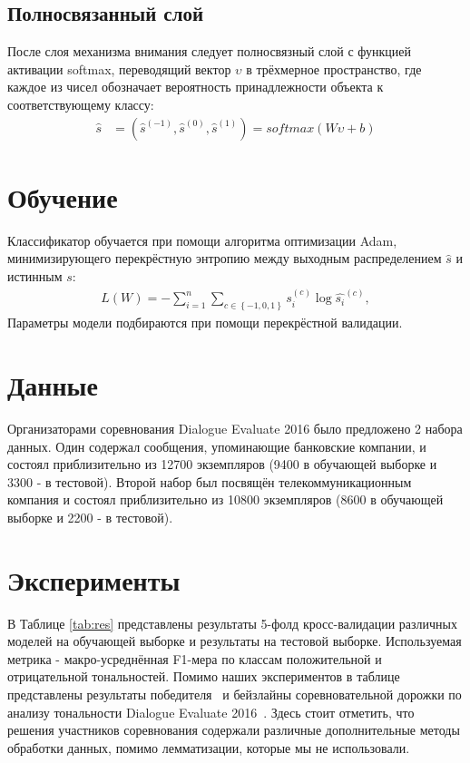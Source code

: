 \documentclass[12pt]{article}
\newcommand{\ENGLISH}[1]{#1}
\begin{document}
\subsection{Полносвязанный слой}
После слоя механизма внимания следует полносвязный слой с функцией активации \ENGLISH{softmax}, переводящий вектор $\upsilon$ в трёхмерное пространство, где каждое из чисел обозначает вероятность принадлежности объекта к соответствующему классу:
	\begin{align}	
    \hat{s}&=(\hat{s}^{(-1)},\hat{s}^{(0)},\hat{s}^{(1)})=softmax(W\upsilon+b)
	\end{align}

\section{Обучение}
Классификатор обучается при помощи алгоритма оптимизации Adam, минимизирующего перекрёстную энтропию между выходным распределением $\hat{s}$ и истинным $s$:
    \begin{align}
    L(W)=-\sum_{i=1}^{n}\sum_{c\in\left \{ -1,0,1 \right \}}s_{i}^{(c)}\log{\hat{s_{i}}^{(c)}},
    \end{align}
Параметры модели подбираются при помощи перекрёстной валидации.

\section{Данные}
Организаторами соревнования Dialogue Evaluate 2016 было предложено 2 набора данных. Один содержал сообщения, упоминающие банковские компании, и состоял приблизительно из 12700 экземпляров (9400 в обучающей выборке и 3300 - в тестовой). Второй набор был посвящён телекоммуникационным компания и состоял приблизительно из 10800 экземпляров (8600 в обучающей выборке и 2200 - в тестовой).

\section{Эксперименты}
В Таблице \ref{tab:res} представлены результаты 5-фолд кросс-валидации различных моделей на обучающей выборке и результаты на тестовой выборке. Используемая метрика - макро-усреднённая F1-мера по классам положительной и отрицательной тональностей. Помимо наших экспериментов в таблице представлены результаты победителя~\cite{arhipenko}  и бейзлайны соревновательной дорожки по анализу тональности Dialogue Evaluate 2016~\cite{senti-ru-eval}. Здесь стоит отметить, что решения участников соревнования содержали различные дополнительные методы обработки данных, помимо лемматизации, которые мы не использовали.
\end{document}
